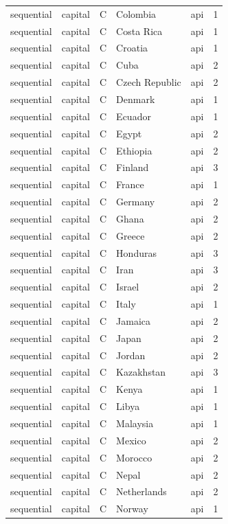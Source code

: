 \begin{tabular}{lllllr}
sequential & capital & C & Colombia & api & 1 \\
sequential & capital & C & Costa Rica & api & 1 \\
sequential & capital & C & Croatia & api & 1 \\
sequential & capital & C & Cuba & api & 2 \\
sequential & capital & C & Czech Republic & api & 2 \\
sequential & capital & C & Denmark & api & 1 \\
sequential & capital & C & Ecuador & api & 1 \\
sequential & capital & C & Egypt & api & 2 \\
sequential & capital & C & Ethiopia & api & 2 \\
sequential & capital & C & Finland & api & 3 \\
sequential & capital & C & France & api & 1 \\
sequential & capital & C & Germany & api & 2 \\
sequential & capital & C & Ghana & api & 2 \\
sequential & capital & C & Greece & api & 2 \\
sequential & capital & C & Honduras & api & 3 \\
sequential & capital & C & Iran & api & 3 \\
sequential & capital & C & Israel & api & 2 \\
sequential & capital & C & Italy & api & 1 \\
sequential & capital & C & Jamaica & api & 2 \\
sequential & capital & C & Japan & api & 2 \\
sequential & capital & C & Jordan & api & 2 \\
sequential & capital & C & Kazakhstan & api & 3 \\
sequential & capital & C & Kenya & api & 1 \\
sequential & capital & C & Libya & api & 1 \\
sequential & capital & C & Malaysia & api & 1 \\
sequential & capital & C & Mexico & api & 2 \\
sequential & capital & C & Morocco & api & 2 \\
sequential & capital & C & Nepal & api & 2 \\
sequential & capital & C & Netherlands & api & 2 \\
sequential & capital & C & Norway & api & 1 \\

\end{tabular}
